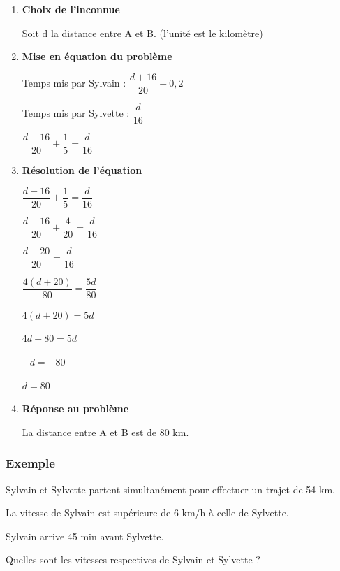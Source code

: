 \begin{enumerate}
\item \textbf{Choix de l'inconnue}

      Soit d la distance entre A et B. (l'unité est le kilomètre)

\item \textbf{ Mise en équation du problème}

Temps mis par Sylvain : $\dfrac{d+16}{20} + 0,2$

Temps mis par Sylvette : $\dfrac{d}{16}$

$\dfrac{d+16}{20} + \dfrac{1}{5} = \dfrac{d}{16} $


\item \textbf{ Résolution de l'équation}

$\dfrac{d+16}{20} + \dfrac{1}{5} = \dfrac{d}{16} $

$\dfrac{d+16}{20} + \dfrac{4}{20} = \dfrac{d}{16} $

$\dfrac{d+20}{20} = \dfrac{d}{16} $

$\dfrac{4\left(d+20\right)}{80} = \dfrac{5d}{80} $

$4\left(d+20\right) = 5d $

$ 4d + 80 = 5d$

$ -d = -80 $

$ d = 80 $

\item \textbf{ Réponse au problème}

La distance entre A et B est de 80 km.

\end{enumerate}


\newpage

\subsubsection{Exemple }



Sylvain et Sylvette partent simultanément pour effectuer un trajet de 54 km.


La vitesse de Sylvain est supérieure de 6 km/h à celle de Sylvette.

Sylvain arrive 45 min avant Sylvette.

Quelles sont les vitesses respectives de Sylvain et Sylvette ?



